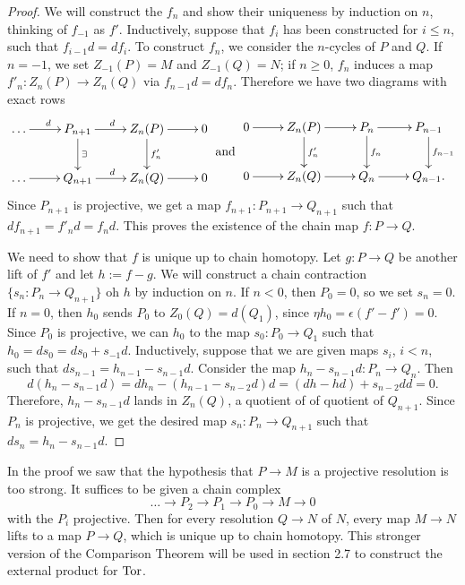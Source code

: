 \begin{proof}
	We will construct the $f_n$ and show their uniqueness by induction on $n$, thinking of $f_{-1}$ as $f'$.
	Inductively, suppose that $f_i$ has been constructed for $i\leq n$, such that $f_{i-1}d=df_i$.
	To construct $f_n$, we consider the $n$-cycles of $P$ and $Q$.
	If $n=-1$, we set $Z_{-1}(P) = M$ and $Z_{-1}(Q) = N$; if $n \geq 0$, $f_n$ induces a map $f'_n: Z_n(P) \rightarrow Z_n(Q)$ via $f_{n-1}d=df_n$.
	Therefore we have two diagrams with exact rows
	\[
		\vcenter{\xymatrix{
				\dots \ar[r]^d &P_{n+1} \ar[r]^d \ar[d]^{\exists} &Z_n(P) \ar[r] \ar[d]^{f'_n} &0 \\
				\dots \ar[r] &Q_{n+1} \ar[r]^d &Z_n(Q) \ar[r] &0
		}}
		\text{ and }
		\vcenter{\xymatrix{
				0 \ar[r] &Z_n(P) \ar[r] \ar[d]^{f'_n} &P_n \ar[r] \ar[d]^{f_n} &P_{n-1} \ar[d]^{f_{n-1}} \\
				0 \ar[r] &Z_n(Q) \ar[r] &Q_n \ar[r] &Q_{n-1}.
	}}
	\]
	Since $P_{n+1}$ is projective, we get a map $f_{n+1}: P_{n+1} \rightarrow Q_{n+1}$ such that $df_{n+1} = f'_nd = f_nd$.
	This proves the existence of the chain map $f: P \rightarrow Q$.
	
	We need to show that $f$ is unique up to chain homotopy.
	Let $g: P \rightarrow Q$ be another lift of $f'$ and let $h := f - g$.
	We will construct a chain contraction $\{s_n: P_n \rightarrow Q_{n+1}\}$ oh $h$ by induction on $n$.
	If $n<0$, then $P_0 = 0$, so we set $s_n = 0$.
	If $n=0$, then $h_0$ sends $P_0$ to $Z_0(Q)=d(Q_1)$, since $\eta h_0 = \epsilon(f' - f') = 0$.
	Since $P_0$ is projective, we can $h_0$ to the map $s_0: P_0 \rightarrow Q_1$ such that $h_0 = d s_0 = d s_0 + s_{-1} d$.
	Inductively, suppose that we are given maps $s_i$, $i<n$, such that $d s_{n-1} = h_{n-1} - s_{n-1} d$.
	Consider the map $h_n - s_{n-1} d: P_n \rightarrow Q_n$.
	Then
	\[d(h_n - s_{n-1} d) = d h_n - (h_{n-1} - s_{n-2} d) d = (dh - hd) + s_{n-2} d d = 0.\]
	Therefore, $h_n - s_{n-1}d$ lands in $Z_n(Q)$, a quotient of of quotient of $Q_{n+1}$.
	Since $P_n$ is projective, we get the desired map $s_n: P_n \rightarrow Q_{n+1}$ such that $d s_n = h_n - s_{n-1} d$.
\end{proof}

\begin{porism}
	In the proof we saw that the hypothesis that $P\rightarrow M$ is a projective resolution is too strong.
	It suffices to be given a chain complex
	$$\dots \rightarrow P_2 \rightarrow P_1 \rightarrow P_0 \rightarrow M \rightarrow 0$$
	with the $P_i$ projective.
	Then for every resolution $Q\rightarrow N$ of $N$, every map $M\rightarrow N$ lifts to a map $P\rightarrow Q$, which is unique up to chain homotopy.
	This stronger version of the Comparison Theorem will be used in section 2.7 to construct the external product for $\operatorname{Tor}$.
\end{porism}

